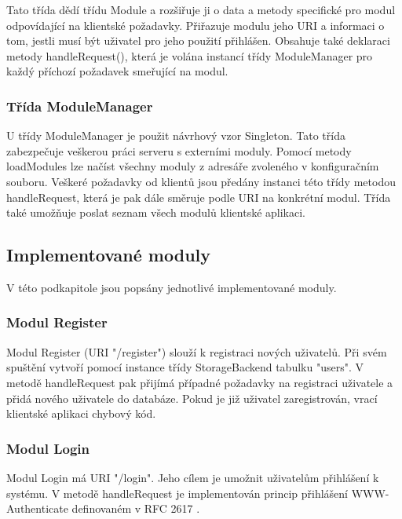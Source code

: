 Tato třída dědí třídu Module a rozšiřuje ji o data a metody specifické pro modul odpovídající na klientské požadavky.
Přiřazuje modulu jeho URI a informaci o tom, jestli musí být uživatel pro jeho použití přihlášen.
Obsahuje také deklaraci metody handleRequest(), která je volána instancí třídy ModuleManager pro každý příchozí požadavek
smeřující na modul.

\subsubsection{Třída ModuleManager}

U třídy ModuleManager je použit návrhový vzor Singleton.
Tato třída zabezpečuje veškerou práci serveru s externími moduly. Pomocí 
metody loadModules lze načíst všechny moduly z adresáře zvoleného v konfiguračním souboru. Veškeré požadavky od klientů
jsou předány instanci této třídy metodou handleRequest, která je pak dále směruje podle URI na konkrétní modul. Třída také
umožňuje poslat seznam všech modulů klientské aplikaci.

\subsection{Implementované moduly} %
\label{implementovane_moduly}

V této podkapitole jsou popsány jednotlivé implementované moduly.

\subsubsection{Modul Register}

Modul Register (URI "/register") %
slouží k registraci nových uživatelů. Při svém spuštění vytvoří pomocí
instance třídy StorageBackend tabulku "users". V metodě handleRequest pak přijímá případné požadavky na registraci
uživatele a přidá nového uživatele do databáze. Pokud je již uživatel zaregistrován, vrací klientské aplikaci chybový kód.

\subsubsection{Modul Login}

Modul Login má URI "/login". Jeho cílem je umožnit uživatelům přihlášení k systému. V metodě handleRequest je
implementován princip přihlášení WWW-Authenticate definovaném v RFC 2617 \cite{rfc2617}. %

